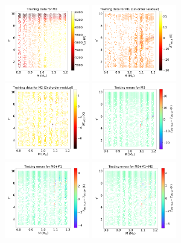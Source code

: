 \begin{figure}
	\includegraphics[width=0.33\textwidth]{M0_data.pdf}	
	\includegraphics[width=0.33\textwidth]{M1_data.pdf}
	\includegraphics[width=0.33\textwidth]{M2_data.pdf}
		\includegraphics[width=0.33\textwidth]{M0_test.pdf}	
	\includegraphics[width=0.33\textwidth]{M1_test.pdf}
	\includegraphics[width=0.33\textwidth]{M2_test.pdf}

\end{figure}
